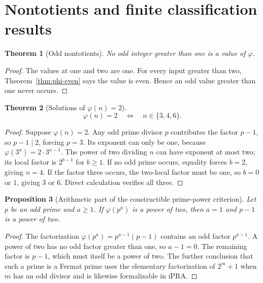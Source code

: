 \documentclass[11pt]{article}
\newtheorem{theorem}{Theorem}[section]
\newtheorem{proposition}[theorem]{Proposition}
\theoremstyle{definition}
\newcommand{\ipra}{\mathrm{iPRA}}
\begin{document}
\section{Nontotients and finite classification results}

\begin{theorem}[Odd nontotients]\label{thm:odd-nontotient}
No odd integer greater than one is a value of \(\varphi\).
\end{theorem}

\begin{proof}
The values at one and two are one.  For every input greater than two,
Theorem~\ref{thm:phi-even} says the value is even.  Hence an odd value greater
than one never occurs.
\end{proof}

\begin{theorem}[Solutions of \(\varphi(n)=2\)]\label{thm:phi-two}
\[
 \boxed{\varphi(n)=2\quad\Longleftrightarrow\quad n\in\{3,4,6\}.}
\]
\end{theorem}

\begin{proof}
Suppose \(\varphi(n)=2\).  Any odd prime divisor \(p\) contributes the factor
\(p-1\), so \(p-1\mid2\), forcing \(p=3\).  Its exponent can only be one,
because \(\varphi(3^a)=2\cdot3^{a-1}\).  The power of two dividing \(n\)
can have exponent at most two; its local factor is \(2^{b-1}\) for \(b\ge1\).
If no odd prime occurs, equality forces \(b=2\), giving \(n=4\).  If the
factor three occurs, the two-local factor must be one, so \(b=0\) or \(1\),
giving \(3\) or \(6\).  Direct calculation verifies all three.
\end{proof}

\begin{proposition}[Arithmetic part of the constructible prime-power criterion]
Let \(p\) be an odd prime and \(a\ge1\).  If \(\varphi(p^a)\) is a power of
two, then \(a=1\) and \(p-1\) is a power of two.
\end{proposition}

\begin{proof}
The factorization
\(\varphi(p^a)=p^{a-1}(p-1)\) contains an odd factor \(p^{a-1}\).  A power
of two has no odd factor greater than one, so \(a-1=0\).  The remaining factor
is \(p-1\), which must itself be a power of two.  The further conclusion that
such a prime is a Fermat prime uses the elementary factorization of
\(2^m+1\) when \(m\) has an odd divisor and is likewise formalizable in
\(\ipra\).
\end{proof}
\end{document}
